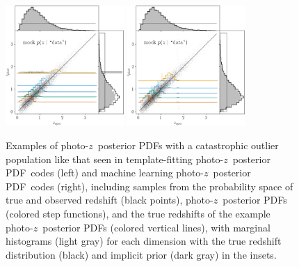 \documentclass[iop]{emulateapj}
\newcommand{\pz}{photo-$z$}
\newcommand{\pzpdf}{\pz\ posterior PDF}
\begin{document}
\begin{figure}
	\begin{center}
		\includegraphics[width=0.4\textwidth]{data_outlier_template.png}
		\includegraphics[width=0.4\textwidth]{data_outlier_training.png}
		\caption{
			Examples of \pzpdf s with a catastrophic outlier population like that seen in template-fitting \pzpdf\ codes (left) and machine learning \pzpdf\ codes (right), including samples from the probability space of true and observed redshift (black points), \pzpdf s (colored step functions), and the true redshifts of the example \pzpdf s (colored vertical lines), with marginal histograms (light gray) for each dimension with the true redshift distribution (black) and implicit prior (dark gray) in the insets.		
		}
		\label{fig:nonuniform-outliers-data}
	\end{center}
\end{figure}
\end{document}
